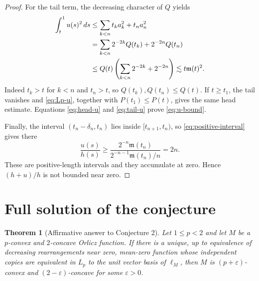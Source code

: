\documentclass[11pt]{article}
\newtheorem{theorem}{Theorem}
\theoremstyle{definition}
\theoremstyle{remark}
\newcommand{\mfun}{\mathfrak m}
\newcommand{\lesssimc}{\mathrel{\lesssim}}
\begin{document}
\begin{proof}
For the tail term, the decreasing character of $Q$ yields
\begin{align}
  \int_t^1u(s)^2\,ds
  &\leq\sum_{k<n}t_ka_k^2+t_na_n^2\notag\\
  &=\sum_{k<n}2^{-2k}Q(t_k)+2^{-2n}Q(t_n)\notag\\
  &\leq Q(t)\left(\sum_{k<n}2^{-2k}+2^{-2n}\right)
   \lesssimc t\mfun(t)^2.\label{eq:tail-u}
\end{align}
Indeed $t_k>t$ for $k<n$ and $t_n>t$, so $Q(t_k),Q(t_n)\leq Q(t)$.
If $t\geq t_1$, the tail vanishes and \eqref{eq:Lp-u}, together with
$P(t_1)\leq P(t)$, gives the same head estimate.  Equations
\eqref{eq:head-u} and \eqref{eq:tail-u} prove \eqref{eq:u-bound}.

Finally, the interval $(t_n-\delta_n,t_n)$ lies inside
$[t_{n+1},t_n)$, so \eqref{eq:positive-interval} gives there
\[
  \frac{u(s)}{h(s)}
  \geq
  \frac{2^{-n}\mfun(t_n)}{2^{-n-1}\mfun(t_n)/n}
  =2n.
\]
These are positive-length intervals and they accumulate at zero.  Hence
$(h+u)/h$ is not bounded near zero.
\end{proof}

\section{Full solution of the conjecture}

\begin{theorem}[Affirmative answer to Conjecture 2]\label{thm:main}
Let $1\leq p<2$ and let $M$ be a $p$-convex and $2$-concave Orlicz function.
If there is a unique, up to equivalence of decreasing rearrangements near
zero, mean-zero function whose independent copies are equivalent in $L_p$ to
the unit vector basis of $\ell_M$, then $M$ is
$(p+\varepsilon)$-convex and $(2-\varepsilon)$-concave for some
$\varepsilon>0$.
\end{theorem}
\end{document}
